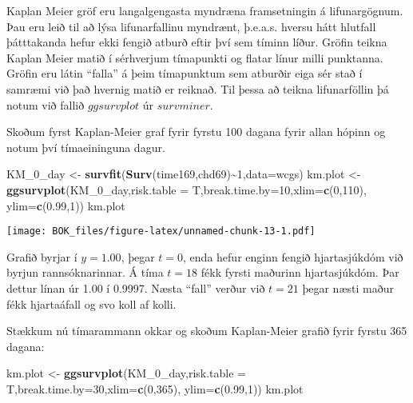 \documentclass[
]{book}
\newenvironment{Shaded}{\begin{snugshade}}{\end{snugshade}}
\newcommand{\DataTypeTok}[1]{\textcolor[rgb]{0.13,0.29,0.53}{#1}}
\newcommand{\DecValTok}[1]{\textcolor[rgb]{0.00,0.00,0.81}{#1}}
\newcommand{\FloatTok}[1]{\textcolor[rgb]{0.00,0.00,0.81}{#1}}
\newcommand{\KeywordTok}[1]{\textcolor[rgb]{0.13,0.29,0.53}{\textbf{#1}}}
\newcommand{\NormalTok}[1]{#1}
\newcommand{\OperatorTok}[1]{\textcolor[rgb]{0.81,0.36,0.00}{\textbf{#1}}}
\newcommand{\StringTok}[1]{\textcolor[rgb]{0.31,0.60,0.02}{#1}}
\begin{document}
Kaplan Meier gröf eru langalgengasta myndræna framsetningin á lifunargögnum. Þau eru leið til að lýsa lifunarfallinu myndrænt, þ.e.a.s. hversu hátt hlutfall þátttakanda hefur ekki fengið atburð eftir því sem tíminn líður. Gröfin teikna Kaplan Meier matið í sérhverjum tímapunkti og flatar línur milli punktanna. Gröfin eru látin ``falla'' á þeim tímapunktum sem atburðir eiga sér stað í samræmi við það hvernig matið er reiknað. Til þessa að teikna lifunarföllin þá notum við fallið \(ggsurvplot\) úr \(survminer\).

Skoðum fyrst Kaplan-Meier graf fyrir fyrstu 100 dagana fyrir allan hópinn og notum því tímaeininguna dagur.

\begin{Shaded}
\begin{Highlighting}[]
\NormalTok{KM\_}\DecValTok{0}\NormalTok{\_day <{-}}\StringTok{ }\KeywordTok{survfit}\NormalTok{(}\KeywordTok{Surv}\NormalTok{(time169,chd69)}\OperatorTok{\textasciitilde{}}\DecValTok{1}\NormalTok{,}\DataTypeTok{data=}\NormalTok{wcgs)}
\NormalTok{km.plot <{-}}\StringTok{ }\KeywordTok{ggsurvplot}\NormalTok{(KM\_}\DecValTok{0}\NormalTok{\_day,}\DataTypeTok{risk.table =}\NormalTok{ T,}\DataTypeTok{break.time.by=}\DecValTok{10}\NormalTok{,}\DataTypeTok{xlim=}\KeywordTok{c}\NormalTok{(}\DecValTok{0}\NormalTok{,}\DecValTok{110}\NormalTok{),}
                      \DataTypeTok{ylim=}\KeywordTok{c}\NormalTok{(}\FloatTok{0.99}\NormalTok{,}\DecValTok{1}\NormalTok{)) }
\NormalTok{km.plot }
\end{Highlighting}
\end{Shaded}

\texttt{[image: BOK\_files/figure-latex/unnamed-chunk-13-1.pdf]}

Grafið byrjar í \(y=1.00\), þegar \(t=0\), enda hefur enginn fengið hjartasjúkdóm við byrjun rannsóknarinnar. Á tíma \(t=18\) fékk fyrsti maðurinn hjartasjúkdóm. Þar dettur línan úr 1.00 í 0.9997. Næsta ``fall'' verður við \(t=21\) þegar næsti maður fékk hjartaáfall og svo koll af kolli.

Stækkum nú tímarammann okkar og skoðum Kaplan-Meier grafið fyrir fyrstu 365 dagana:

\begin{Shaded}
\begin{Highlighting}[]
\NormalTok{km.plot <{-}}\StringTok{ }\KeywordTok{ggsurvplot}\NormalTok{(KM\_}\DecValTok{0}\NormalTok{\_day,}\DataTypeTok{risk.table =}\NormalTok{ T,}\DataTypeTok{break.time.by=}\DecValTok{30}\NormalTok{,}\DataTypeTok{xlim=}\KeywordTok{c}\NormalTok{(}\DecValTok{0}\NormalTok{,}\DecValTok{365}\NormalTok{),}
                      \DataTypeTok{ylim=}\KeywordTok{c}\NormalTok{(}\FloatTok{0.99}\NormalTok{,}\DecValTok{1}\NormalTok{)) }
\NormalTok{km.plot }
\end{Highlighting}
\end{Shaded}
\end{document}
